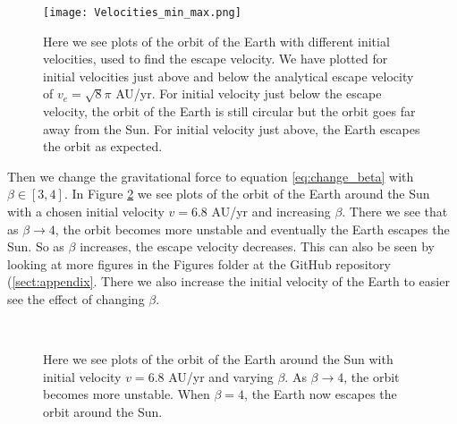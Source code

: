 \documentclass[12pt,a4paper,english]{article}
\begin{document}
\begin{figure}[htbp]
	\centering\texttt{[image: Velocities\_min\_max.png]}
	\caption{Here we see plots of the orbit of the Earth with different initial velocities, used to find the escape velocity. We have plotted for initial velocities just above and below the analytical escape velocity of $v_e=\sqrt{8}\pi$ AU/yr. For initial velocity just below the escape velocity, the orbit of the Earth is still circular but the orbit goes far away from the Sun. For initial velocity just above, the Earth escapes the orbit as expected. \label{fig:escape_vel}}
\end{figure}

Then we change the gravitational force to equation \ref{eq:change_beta} with $\beta\in[3,4]$. In Figure \ref{fig:beta_change} we see plots of the orbit of the Earth around the Sun with a chosen initial velocity $v=6.8$ AU/yr and increasing $\beta$. There we see that as $\beta\rightarrow4$, the orbit becomes more unstable and eventually the Earth escapes the Sun. So as $\beta$ increases, the escape velocity decreases. This can also be seen by looking at more figures in the Figures folder at the GitHub repository (\ref{sect:appendix}. There we also increase the initial velocity of the Earth to easier see the effect of changing $\beta$.

\begin{figure}[htbp]
	\hspace{0.5em}
	\\
	\hspace{0.5em}
	\caption{Here we see plots of the orbit of the Earth around the Sun with initial velocity $v=6.8$ AU/yr and varying $\beta$. As $\beta\rightarrow4$, the orbit becomes more unstable. When $\beta=4$, the Earth now escapes the orbit around the Sun. \label{fig:beta_change}}
\end{figure}
\end{document}
